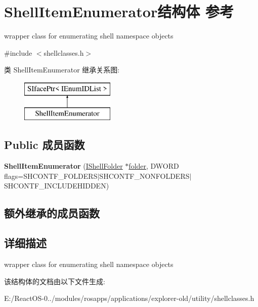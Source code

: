\hypertarget{struct_shell_item_enumerator}{}\section{Shell\+Item\+Enumerator结构体 参考}
\label{struct_shell_item_enumerator}


wrapper class for enumerating shell namespace objects  




{\ttfamily \#include $<$shellclasses.\+h$>$}

类 Shell\+Item\+Enumerator 继承关系图\+:\begin{figure}[H]
\begin{center}
\leavevmode
\includegraphics[height=2.000000cm]{struct_shell_item_enumerator}
\end{center}
\end{figure}
\subsection*{Public 成员函数}
\begin{DoxyCompactItemize}
\item 
\mbox{\label{struct_shell_item_enumerator_a44d269380a8f30293cd64572206e7600}} 
{\bfseries Shell\+Item\+Enumerator} (\hyperlink{interface_i_shell_folder}{I\+Shell\+Folder} $\ast$\hyperlink{structfolder}{folder}, D\+W\+O\+RD flags=S\+H\+C\+O\+N\+T\+F\+\_\+\+F\+O\+L\+D\+E\+RS$\vert$S\+H\+C\+O\+N\+T\+F\+\_\+\+N\+O\+N\+F\+O\+L\+D\+E\+RS$\vert$S\+H\+C\+O\+N\+T\+F\+\_\+\+I\+N\+C\+L\+U\+D\+E\+H\+I\+D\+D\+EN)
\end{DoxyCompactItemize}
\subsection*{额外继承的成员函数}


\subsection{详细描述}
wrapper class for enumerating shell namespace objects 

该结构体的文档由以下文件生成\+:\begin{DoxyCompactItemize}
\item 
E\+:/\+React\+O\+S-\/0../modules/rosapps/applications/explorer-\/old/utility/shellclasses.\+h\end{DoxyCompactItemize}
